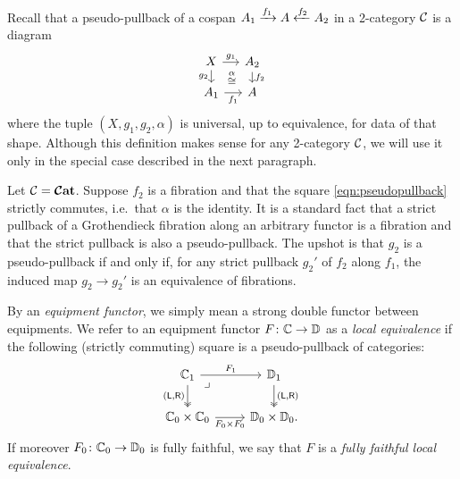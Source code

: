 \documentclass[11pt,oneside,article]{memoir}
\begin{document}
Recall that a pseudo-pullback of a cospan $A_1\xrightarrow{f_1}A\xleftarrow{f_2}A_2$ in a 2-category $\mathcal{C}$ is a diagram
\begin{equation}
    \label{eqn:pseudopullback}
  \begin{tikzcd}[sep=small]
    X \ar[r,"g_1"] \ar[d,"g_2"'] \ar[rd,phantom,"\overset{\alpha}{\footnotesize\cong}"]
      & A_2 \ar[d,"f_2"] \\
    A_1 \ar[r,"f_1"']
      & A
  \end{tikzcd}
\end{equation}
where the tuple $(X,g_1,g_2,\alpha)$ is universal, up to equivalence, for data of that shape.
Although this definition makes sense for any 2-category $\mathcal{C}$, we will use it only in the
special case described in the next paragraph.

Let $\mathcal{C}=\bm{\mathcal{C}}\mathbf{at}$.  Suppose $f_2$ is a fibration and that the square \eqref{eqn:pseudopullback}
strictly commutes, i.e.\ that $\alpha$ is the identity. It is a standard fact that a strict pullback
of a Grothendieck fibration along an arbitrary functor is a fibration and that the strict pullback
is also a pseudo-pullback. The upshot is that $g_2$ is a pseudo-pullback if and only if, for any
strict pullback $g_2'$ of $f_2$ along $f_1$, the induced map $g_2\to g_2'$ is an equivalence of
fibrations.

\begin{definition}
    \label{def:local_equivalence}
  By an \emph{equipment functor}, we simply mean a strong double functor between equipments. We
  refer to an equipment functor $F\colon\mathbb{C}\to\mathbb{D}$ as a \emph{local equivalence} if the
  following (strictly commuting) square is a pseudo-pullback of categories:
  \begin{equation} \begin{tikzcd}
      \label{eqn:local_equiv}
    \dcat{C}_1 \ar[r,"F_1"] \ar[d,two heads,"{(\lframe,\rframe)}"'] \ar[dr,phantom,"\lrcorner" very near start]
      & \dcat{D}_1 \ar[d,two heads,"{(\lframe,\rframe)}"] \\
    \dcat{C}_0\times\dcat{C}_0 \ar[r,"F_0\times F_0"']
      & \dcat{D}_0\times\dcat{D}_0.
  \end{tikzcd} \end{equation}
   If moreover $F_0\colon\mathbb{C}_0\to\mathbb{D}_0$ is fully faithful, we say that $F$ is a
   \emph{fully faithful local equivalence}.
\end{definition}
\end{document}
